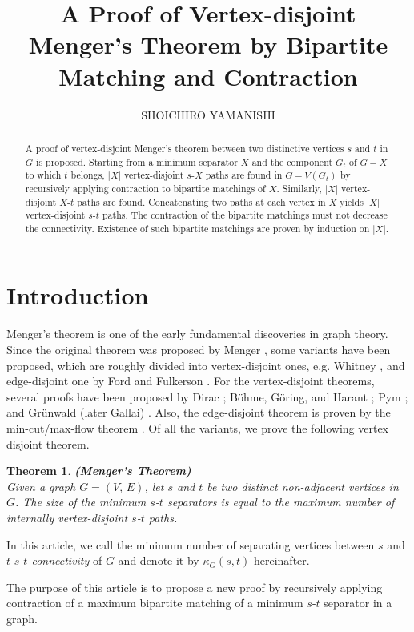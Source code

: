 \documentclass{article}
\title{A Proof of Vertex-disjoint Menger's Theorem by Bipartite Matching and Contraction}
\author{SHOICHIRO YAMANISHI}
\newtheorem{theorem}{Theorem}
\begin{document}
\maketitle

\begin{abstract}
A proof of vertex-disjoint Menger's theorem between two distinctive vertices $s$ and $t$ in $G$ is proposed.
Starting from a minimum separator $X$ and the component $G_t$ of $G - X$ to which $t$ belongs, $|X|$ vertex-disjoint
$s$-$X$ paths are found in $G - V(G_t)$ by recursively applying contraction to bipartite matchings of $X$.
Similarly, $|X|$ vertex-disjoint $X$-$t$ paths are found. Concatenating two paths at each vertex in $X$ yields
$|X|$ vertex-disjoint $s$-$t$ paths. The contraction of the bipartite matchings must not decrease the connectivity.
Existence of such bipartite matchings are proven by induction on $|X|$. 
\end{abstract}



\section{Introduction}
Menger's theorem is one of the early fundamental discoveries in graph theory.
Since the original theorem was proposed by Menger \cite{menger1}, some variants have been proposed,
which are roughly divided into
vertex-disjoint ones, e.g. Whitney \cite{whitney1},  and edge-disjoint one by Ford and Fulkerson \cite{fordfulkerson1}.
For the vertex-disjoint theorems, several proofs have been proposed
by Dirac \cite{dirac1}; B\"{o}hme, G\"{o}ring, and Harant \cite{bohmegoringharant1};
Pym \cite{pym1}; and Gr\"{u}nwald (later Gallai) \cite{grunwald1}.
Also, the edge-disjoint theorem is proven by the min-cut/max-flow theorem \cite{fordfulkerson1}.
Of all the variants, we prove the following vertex disjoint theorem.
\begin{theorem}\label{theorem1}
{\bf (Menger's Theorem)}\\Given a graph $G=(V,\,E)$, let $s$ and $t$ be two
distinct non-adjacent vertices in $G$. The size of the minimum $s$-$t$ separators
is equal to the maximum number of internally vertex-disjoint $s$-$t$ paths.
\end{theorem}
In this article, we call the minimum number of separating vertices between $s$ and $t$ {\it $s$-$t$ connectivity} of $G$
and denote it by $\kappa_G(s, t)$ hereinafter.

The purpose of this article is to propose a new proof by recursively applying contraction of
a maximum bipartite matching of a minimum $s$-$t$ separator in a graph.
\end{document}
